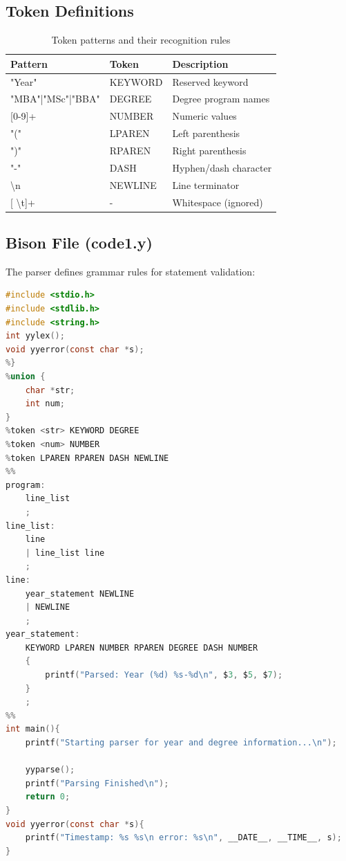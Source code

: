 \documentclass[12pt,a4paper]{article}
\begin{document}
\subsection{Token Definitions}
\begin{table}[h]
\centering
\begin{tabular}{|l|l|l|}
\hline
\textbf{Pattern} & \textbf{Token} & \textbf{Description} \\
\hline
"Year" & KEYWORD & Reserved keyword \\
"MBA"|"MSc"|"BBA" & DEGREE & Degree program names \\
{[}0-9{]}+ & NUMBER & Numeric values \\
"(" & LPAREN & Left parenthesis \\
")" & RPAREN & Right parenthesis \\
"-" & DASH & Hyphen/dash character \\
\textbackslash n & NEWLINE & Line terminator \\
{[ }\textbackslash t{]}+ & - & Whitespace (ignored) \\
\hline
\end{tabular}
\caption{Token patterns and their recognition rules}
\end{table}

\subsection{Bison File (code1.y)}
The parser defines grammar rules for statement validation:

\begin{lstlisting}[language=C, caption={code1.y - Bison Parser Specification}]
%{
#include <stdio.h>
#include <stdlib.h>
#include <string.h>
int yylex();
void yyerror(const char *s);
%}
%union {
    char *str;
    int num;
}
%token <str> KEYWORD DEGREE
%token <num> NUMBER
%token LPAREN RPAREN DASH NEWLINE
%%
program:
    line_list
    ;
line_list:
    line
    | line_list line
    ;
line:
    year_statement NEWLINE
    | NEWLINE
    ;
year_statement:
    KEYWORD LPAREN NUMBER RPAREN DEGREE DASH NUMBER
    {
        printf("Parsed: Year (%d) %s-%d\n", $3, $5, $7);
    }
    ;
%%
int main(){
    printf("Starting parser for year and degree information...\n");
    
    yyparse();
    printf("Parsing Finished\n");
    return 0;
}
void yyerror(const char *s){
    printf("Timestamp: %s %s\n error: %s\n", __DATE__, __TIME__, s);
}
\end{lstlisting}
\end{document}
